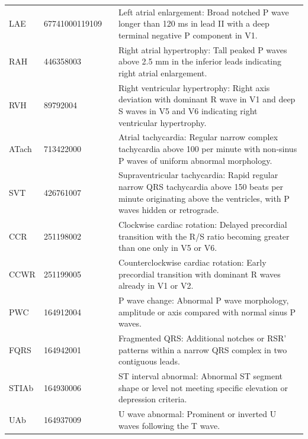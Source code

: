 \begin{longtable}{@{}l l c p{}@{}}
LAE & 67741000119109 &  & Left atrial enlargement: Broad notched P wave longer than 120 ms in lead II with a deep terminal negative P component in V1. \\
RAH & 446358003 &  & Right atrial hypertrophy: Tall peaked P waves above 2.5 mm in the inferior leads indicating right atrial enlargement. \\
RVH & 89792004 &  & Right ventricular hypertrophy: Right axis deviation with dominant R wave in V1 and deep S waves in V5 and V6 indicating right ventricular hypertrophy. \\
ATach & 713422000 &  & Atrial tachycardia: Regular narrow complex tachycardia above 100 per minute with non-sinus P waves of uniform abnormal morphology. \\
SVT & 426761007 &  & Supraventricular tachycardia: Rapid regular narrow QRS tachycardia above 150 beats per minute originating above the ventricles, with P waves hidden or retrograde. \\
CCR & 251198002 &  & Clockwise cardiac rotation: Delayed precordial transition with the R/S ratio becoming greater than one only in V5 or V6. \\
CCWR & 251199005 &  & Counterclockwise cardiac rotation: Early precordial transition with dominant R waves already in V1 or V2. \\
PWC & 164912004 &  & P wave change: Abnormal P wave morphology, amplitude or axis compared with normal sinus P waves. \\
FQRS & 164942001 &  & Fragmented QRS: Additional notches or RSR' patterns within a narrow QRS complex in two contiguous leads. \\
STIAb & 164930006 &  & ST interval abnormal: Abnormal ST segment shape or level not meeting specific elevation or depression criteria. \\
UAb & 164937009 &  & U wave abnormal: Prominent or inverted U waves following the T wave. \\
\bottomrule \end{longtable}
\endgroup

